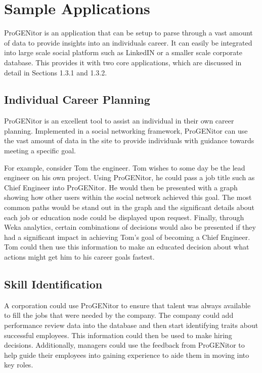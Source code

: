 \section{Sample Applications}
\label{sect:user-stories}
ProGENitor is an application that can be setup to parse through a vast amount
of data to provide insights into an individuals career.  It can easily be
integrated into large scale social platform such as LinkedIN or a smaller scale
corporate database.  This provides it with two core applications, which are
discussed in detail in Sections 1.3.1 and 1.3.2.

\subsection{Individual Career Planning}
ProGENitor is an excellent tool to assist an individual in their own career
planning.  Implemented in a social networking framework, ProGENitor can use the
vast amount of data in the site to provide individuals with
guidance towards meeting a specific goal.  

For example, consider Tom the engineer.  Tom wishes to some day be the lead
engineer on his own project.  Using ProGENitor, he could pass a job title such
as Chief Engineer into ProGENitor.  He would then be presented with a graph
showing how other users within the social network achieved this goal.  The most
common paths would be stand out in the graph and the significant details about
each job or education node could be displayed upon request.  Finally, through
Weka analytics, certain combinations of decisions would also be presented if
they had a significant impact in achieving Tom's goal of becoming a Chief
Engineer.  Tom could then use this information to make an  educated decision
about what actions might get him to his career goals fastest.

\subsection{Skill Identification}
A corporation could use ProGENitor to ensure that talent was always
available to fill the jobs that were needed by the company.  The company could
add performance review data into the database and then start identifying traits
about successful employees.  This information could then be used to make hiring
decisions.  Additionally, managers could use the feedback from ProGENitor to
help guide their employees into gaining experience to aide them in moving into
key roles.
	
